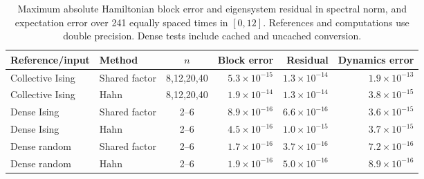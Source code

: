 \begin{table}[htbp]
\centering\small
\begin{tabular}{llcrrr}
\toprule
Reference/input & Method & $n$ & Block error & Residual & Dynamics error \\
\midrule
Collective Ising & Shared factor & 8,12,20,40 & $5.3\times10^{-15}$ & $1.3\times10^{-14}$ & $1.9\times10^{-13}$ \\
Collective Ising & Hahn & 8,12,20,40 & $1.9\times10^{-14}$ & $1.3\times10^{-14}$ & $3.8\times10^{-15}$ \\
Dense Ising & Shared factor & 2--6 & $8.9\times10^{-16}$ & $6.6\times10^{-16}$ & $3.6\times10^{-15}$ \\
Dense Ising & Hahn & 2--6 & $4.5\times10^{-16}$ & $1.0\times10^{-15}$ & $3.7\times10^{-15}$ \\
Dense random & Shared factor & 2--6 & $1.7\times10^{-16}$ & $3.7\times10^{-16}$ & $7.2\times10^{-16}$ \\
Dense random & Hahn & 2--6 & $1.9\times10^{-16}$ & $5.0\times10^{-16}$ & $8.9\times10^{-16}$ \\
\bottomrule
\end{tabular}
\caption{Maximum absolute Hamiltonian block error and eigensystem residual in spectral norm, and expectation error over 241 equally spaced times in $[0,12]$. References and computations use double precision. Dense tests include cached and uncached conversion.}
\label{tab:application_accuracy}
\end{table}

